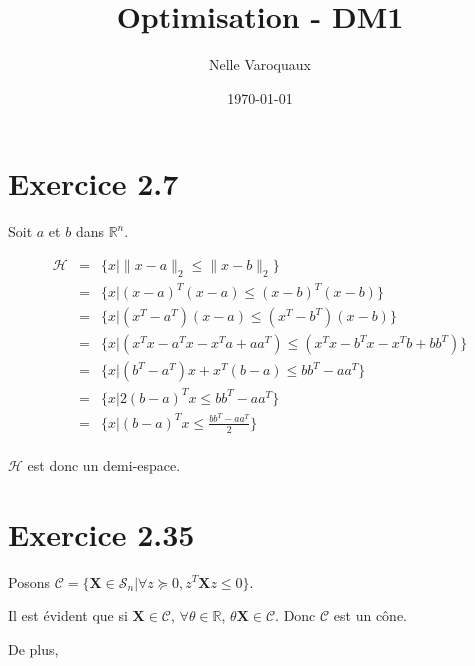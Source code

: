 \documentclass{article}
\date{\today}
\title{Optimisation - DM1}
\author{Nelle Varoquaux}
\begin{document}
\maketitle

\section{Exercice 2.7}

Soit $a$ et $b$ dans $\mathbb{R}^n$.

\begin{align*}
\mathcal{H} & = & \{ x | \|x - a\|_2 \leq \|x - b\|_2 \} \\
	    & = & \{ x | (x - a)^T(x -a) \leq (x - b)^T(x -b) \} \\
	    & = & \{ x | (x^T - a^T)(x - a) \leq (x^T - b^T)(x -b) \} \\
	    & = & \{ x | (x^Tx - a^Tx - x^Ta + aa^T) \leq (x^Tx - b^Tx - x^Tb
	    + bb^T)  \} \\
	    & = & \{ x | (b^T - a^T)x + x^T(b - a) \leq  bb^T - aa^T \} \\
	    & = & \{ x | 2(b - a)^Tx \leq  bb^T - aa^T \} \\
	    & = & \{ x | (b - a)^Tx \leq  \frac{bb^T - aa^T}{2} \} \\
\end{align*}

$\mathcal{H}$ est donc un demi-espace.

\section{Exercice 2.35}

Posons $\mathcal{C} = \{ \mathbf{X} \in \mathcal{S}_n | \forall z \succeq 0,
z^T \mathbf{X} z
\leq 0\}$.

Il est évident que si $\mathbf{X} \in \mathcal{C}$, $\forall \theta \in
\mathbb{R}$, $\theta \mathbf{X} \in \mathcal{C}$. Donc $\mathcal{C}$ est un
cône.

De plus,
\end{document}
